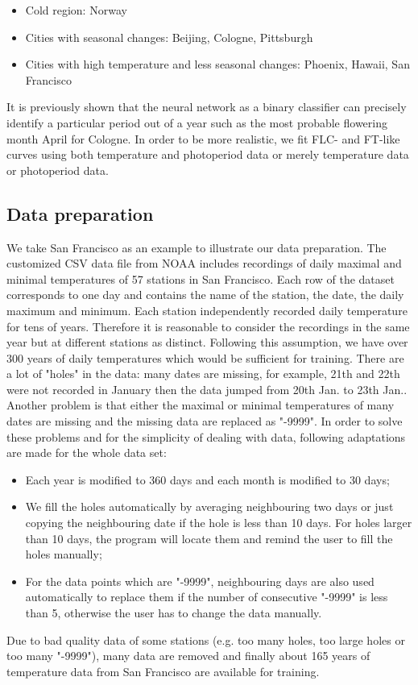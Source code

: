 \documentclass[paper=a4, fontsize=12pt]{scrartcl}	%
\numberwithin{equation}{section}					%
\numberwithin{figure}{section}					%
\numberwithin{table}{section}					%
\begin{document}
\begin{itemize}
\item Cold region: Norway
\item Cities with seasonal changes: Beijing, Cologne, Pittsburgh
\item Cities with high temperature and less seasonal changes: Phoenix, Hawaii, San Francisco
\end{itemize}

It is previously shown that the neural network as a binary classifier can precisely identify a particular period out of a year such as the most probable flowering month April for Cologne. In order to be more realistic, we fit FLC- and FT-like curves using both temperature and photoperiod data or merely temperature data or photoperiod data. 
\subsection{Data preparation}
We take San Francisco as an example to illustrate our data preparation. The customized CSV data file from NOAA includes recordings of daily maximal and minimal temperatures of 57 stations in San Francisco. Each row of the dataset corresponds to one day and contains the name of the station, the date, the daily maximum and minimum. Each station independently recorded daily temperature for tens of years. Therefore it is reasonable to consider the recordings in the same year but at different stations as distinct. Following this assumption, we have over 300 years of daily temperatures which would be sufficient for training. There are a lot of "holes" in the data: many dates are missing, for example, 21th and 22th were not recorded in January then the data jumped from 20th Jan. to 23th Jan.. Another problem is that either the maximal or minimal temperatures of many dates are missing and the missing data are replaced as "-9999". In order to solve these problems and for the simplicity of dealing with data, following adaptations are made for the whole data set:
\begin{itemize}
\item Each year is modified to 360 days and each month is modified to 30 days;
\item We fill the holes automatically by averaging neighbouring two days or just copying the neighbouring date if the hole is less than 10 days. For holes larger than 10 days, the program will locate them and remind the user to fill the holes manually;
\item For the data points which are "-9999", neighbouring days are also used automatically to replace them if the number of consecutive "-9999" is less than 5, otherwise the user has to change the data manually. 
\end{itemize}
Due to bad quality data of some stations (e.g. too many holes, too large holes or too many "-9999"), many data are removed and finally about 165 years of temperature data from San Francisco are available for training. 
\end{document}
